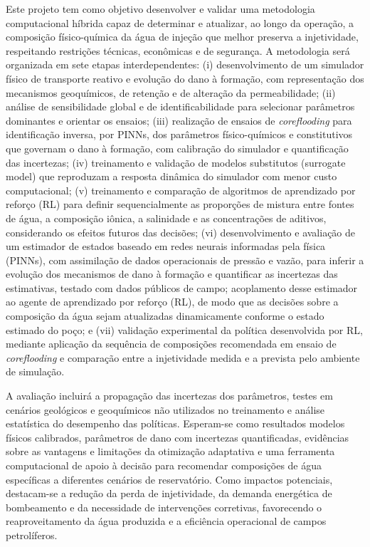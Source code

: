 \documentclass[10pt,a4paper]{article}
\begin{document}
Este projeto tem como objetivo desenvolver e validar uma metodologia computacional híbrida capaz de determinar e atualizar, ao longo da operação, a composição físico-química da água de injeção que melhor preserva a injetividade, respeitando restrições técnicas, econômicas e de segurança. A metodologia será organizada em sete etapas interdependentes: (i) desenvolvimento de um simulador físico de transporte reativo e evolução do dano à formação, com representação dos mecanismos geoquímicos, de retenção e de alteração da permeabilidade; (ii) análise de sensibilidade global e de identificabilidade para selecionar parâmetros dominantes e orientar os ensaios; (iii) realização de ensaios de \textit{coreflooding} para identificação inversa, por PINNs, dos parâmetros físico-químicos e constitutivos que governam o dano à formação, com calibração do simulador e quantificação das incertezas; (iv) treinamento e validação de modelos substitutos (surrogate model) que reproduzam a resposta dinâmica do simulador com menor custo computacional; (v) treinamento e comparação de algoritmos de aprendizado por reforço (RL) para definir sequencialmente as proporções de mistura entre fontes de água, a composição iônica, a salinidade e as concentrações de aditivos, considerando os efeitos futuros das decisões; (vi) desenvolvimento e avaliação de um estimador de estados baseado em redes neurais informadas pela física (PINNs), com assimilação de dados operacionais de pressão e vazão, para inferir a evolução dos mecanismos de dano à formação e quantificar as incertezas das estimativas, testado com dados públicos de campo; acoplamento desse estimador ao agente de aprendizado por reforço (RL), de modo que as decisões sobre a composição da água sejam atualizadas dinamicamente conforme o estado estimado do poço; e (vii) validação experimental da política desenvolvida por RL, mediante aplicação da sequência de composições recomendada em ensaio de \textit{coreflooding} e comparação entre a injetividade medida e a prevista pelo ambiente de simulação.

A avaliação incluirá a propagação das incertezas dos parâmetros, testes em cenários geológicos e geoquímicos não utilizados no treinamento e análise estatística do desempenho das políticas. Esperam-se como resultados modelos físicos calibrados, parâmetros de dano com incertezas quantificadas, evidências sobre as vantagens e limitações da otimização adaptativa e uma ferramenta computacional de apoio à decisão para recomendar composições de água específicas a diferentes cenários de reservatório. Como impactos potenciais, destacam-se a redução da perda de injetividade, da demanda energética de bombeamento e da necessidade de intervenções corretivas, favorecendo o reaproveitamento da água produzida e a eficiência operacional de campos petrolíferos.
\end{document}
